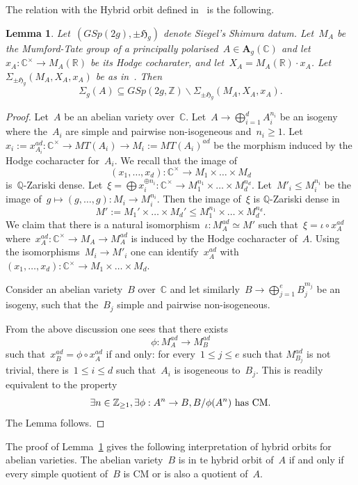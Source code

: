 \documentclass[12pt]{amsart}
\newtheorem{lemma}[theorem]{Lemma}
\newcommand{\R}{{\mathbb R}}
\newcommand{\Z}{{\mathbb Z}}
\newcommand{\Q}{{\mathbb Q}}
\newcommand{\C}{{\mathbb C}}
\begin{document}



The relation with the Hybrid orbit defined in~\cite{RY:LMS1,RY:LMS2} is the following.
\begin{lemma}\label{lem:truc}
Let~$(GSp(2g),\pm\mathfrak{H}_g)$ denote Siegel's Shimura datum. Let~$M_A$ be the Mumford-Tate group of a principally polarised~$A\in \mathbf{A}_g(\C)$ and let~$x_A:\C^\times\to M_A(\R)$
be its Hodge cocharater, and let~$X_A=M_A(\R)\cdot x_A$.
Let~$\Sigma_{\pm\mathfrak{H}_g}(M_A,X_A,x_A)$ be as in~\cite[Def. 6]{RY:LMS1}. Then
\[
\Sigma_g(A)\subseteq GSp(2g,\Z)\backslash\Sigma_{\pm\mathfrak{H}_g}(M_A,X_A,x_A).
\]
\end{lemma}
\begin{proof}Let~$A$ be an abelian variety over~$\C$. Let~$A\to \bigoplus_{i=1}^d A_i^{n_i}$ be an isogeny where the~$A_i$ are simple and pairwise non-isogeneous and~$n_i\geq 1$. Let~$x_i:=x_{A_i}^{ad}:\C^\times \to MT(A_i)\to M_i:=MT(A_i)^{ad}$ be the morphism induced by the Hodge cocharacter for~$A_i$. We recall that the image of
\[
(x_1,\ldots,x_d):\C^\times\to M_1\times\ldots\times M_d
\]
is~$\Q$-Zariski dense. Let~$\xi=\bigoplus x_i^{\oplus n_i}:\C^\times \to M_1^{n_1}\times\ldots\times M_d^{n_d}$.
Let~$M'_i\leq M_i^{n_i}$ be the image of~$g\mapsto (g,\ldots,g):M_i\to M_i^{n_i}$. Then the image of~$\xi$ is $\Q$-Zariski dense in
\[
M':=M_1'\times\ldots\times M_d'\leq M_1^{n_1}\times\ldots\times M_d^{n_d}.
\]
We claim that there is a natural isomorphism~$\iota:M^{ad}_A\simeq M'$ such that~$\xi=\iota\circ x^{ad}_A$ where~$x^{ad}_A:\C^\times\to M_A\to M_A^{ad}$ is induced by the Hodge cocharacter of~$A$. Using the isomorphisms~$M_i\to M'_i$ one can identify~$x_A^{ad}$ with~$(x_1,\ldots,x_d):\C^\times\to M_1\times\ldots \times M_d$.

 Consider an abelian variety~$B$ over~$\C$ and let similarly~$B\to \bigoplus_{j=1}^e B_j^{m_j}$ be an isogeny, such that  the~$B_j$ simple and pairwise non-isogeneous.

From the above discussion one sees that there exists
\[
\phi:M^{ad}_A\to M^{ad}_B
\]
 such that~$x_B^{ad}=\phi\circ x_A^{ad}$ if and only: for every~$1\leq j\leq e$ such that $M^{ad}_{B_j}$ is not trivial, there is~$1\leq i\leq d$ such that~$A_i$ is isogeneous to~$B_j$. This is readily equivalent to the property
\[
\exists n\in \Z_{\geq1},
\exists \phi:A^n\to B,\\ B/\phi(A^n)\text{ has CM}.
\]
The Lemma follows.
\end{proof}
The proof of Lemma~\ref{lem:truc} gives the following interpretation of hybrid orbits for abelian varieties.
The abelian variety~$B$ is in te hybrid orbit of~$A$ if and only if every simple quotient of~$B$ is CM or is also a quotient of~$A$.
\end{document}
